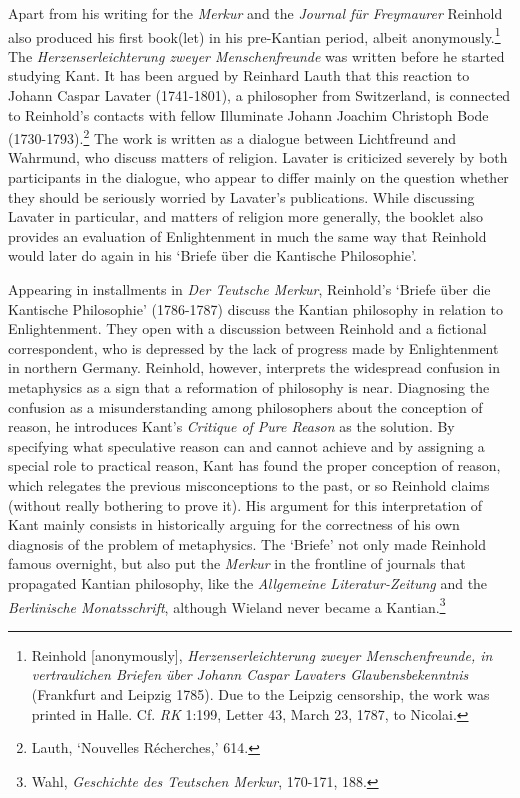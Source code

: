 Apart from his writing for the \textit{Merkur} and the \textit{Journal f\"{u}r Freymaurer} Reinhold also produced his first book(let) in his pre{-}Kantian period, albeit anonymously.\footnote{ Reinhold [anonymously], \textit{Herzenserleichterung zweyer Menschenfreunde, in vertraulichen Briefen \"{u}ber Johann Caspar Lavaters Glaubensbekenntnis} (Frankfurt and Leipzig 1785). Due to the Leipzig censorship, the work was printed in Halle. Cf. \textit{RK} 1:199, Letter 43, March 23, 1787, to Nicolai.} The \textit{Herzenserleichterung zweyer Menschenfreunde} was written before he started studying Kant. It has been argued by Reinhard Lauth that this reaction to Johann Caspar Lavater (1741{-}1801), a philosopher from Switzerland, is connected to Reinhold's contacts with fellow Illuminate Johann Joachim Christoph Bode (1730{-}1793).\footnote{ Lauth, `Nouvelles R\'{e}cherches,' 614.} The work is written as a dialogue between Lichtfreund and Wahrmund, who discuss matters of religion. Lavater is criticized severely by both participants in the dialogue, who appear to differ mainly on the question whether they should be seriously worried by Lavater's publications. While discussing Lavater in particular, and matters of religion more generally, the booklet also provides an evaluation of Enlightenment in much the same way that Reinhold would later do again in his `Briefe \"{u}ber die Kantische Philosophie'. 

 Appearing in installments in \textit{Der Teutsche Merkur}, Reinhold's `Briefe \"{u}ber die Kantische Philosophie' (1786{-}1787) discuss the Kantian philosophy in relation to Enlightenment. They open with a discussion between Reinhold and a fictional correspondent, who is depressed by the lack of progress made by Enlightenment in northern Germany. Reinhold, however, interprets the widespread confusion in metaphysics as a sign that a reformation of philosophy is near. Diagnosing the confusion as a misunderstanding among philosophers about the conception of reason, he introduces Kant's \textit{Critique of Pure Reason }as the solution. By specifying what speculative reason can and cannot achieve and by assigning a special role to practical reason, Kant has found the proper conception of reason, which relegates the previous misconceptions to the past, or so Reinhold claims (without really bothering to prove it). His argument for this interpretation of Kant mainly consists in historically arguing for the correctness of his own diagnosis of the problem of metaphysics. The `Briefe' not only made Reinhold famous overnight, but also put the \textit{Merkur }in the frontline of journals that propagated Kantian philosophy, like the \textit{Allgemeine Literatur{-}Zeitung} and the \textit{Berlinische Monatsschrift}, although Wieland never became a Kantian.\footnote{ Wahl, \textit{Geschichte des Teutschen Merkur}, 170{-}171, 188.} 


